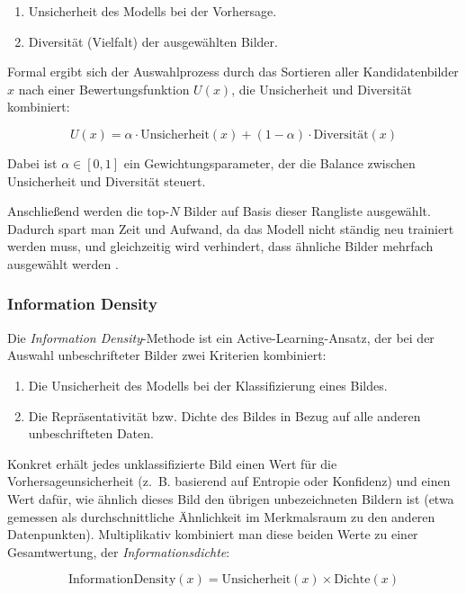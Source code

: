 \documentclass{article}
\begin{document}
	\begin{enumerate}
		\item Unsicherheit des Modells bei der Vorhersage.
		\item Diversität (Vielfalt) der ausgewählten Bilder.
	\end{enumerate}
	
	Formal ergibt sich der Auswahlprozess durch das Sortieren aller Kandidatenbilder $x$ nach einer Bewertungsfunktion $U(x)$, die Unsicherheit und Diversität kombiniert:
	
	\begin{equation}
		U(x) = \alpha \cdot \text{Unsicherheit}(x) + (1 - \alpha) \cdot \text{Diversität}(x)
	\end{equation}
	
	Dabei ist $\alpha \in [0,1]$ ein Gewichtungsparameter, der die Balance zwischen Unsicherheit und Diversität steuert.
	
	Anschließend werden die top-$N$ Bilder auf Basis dieser Rangliste ausgewählt. Dadurch spart man Zeit und Aufwand, da das Modell nicht ständig neu trainiert werden muss, und gleichzeitig wird verhindert, dass ähnliche Bilder mehrfach ausgewählt werden \cite{Cardoso2017}.
	
	
	\subsubsection{Information Density}
	Die \textit{Information Density}-Methode ist ein Active-Learning-Ansatz, der bei der Auswahl unbeschrifteter Bilder zwei Kriterien kombiniert:
	
	\begin{enumerate}
		\item Die Unsicherheit des Modells bei der Klassifizierung eines Bildes.
		\item Die Repräsentativität bzw. Dichte des Bildes in Bezug auf alle anderen unbeschrifteten Daten.
	\end{enumerate}
	
	Konkret erhält jedes unklassifizierte Bild einen Wert für die Vorhersageunsicherheit (z.~B. basierend auf Entropie oder Konfidenz) und einen Wert dafür, wie ähnlich dieses Bild den übrigen unbezeichneten Bildern ist (etwa gemessen als durchschnittliche Ähnlichkeit im Merkmalsraum zu den anderen Datenpunkten). Multiplikativ kombiniert man diese beiden Werte zu einer Gesamtwertung, der \textit{Informationsdichte}:
	
	\begin{equation}
		\text{InformationDensity}(x) = \text{Unsicherheit}(x) \times \text{Dichte}(x)
	\end{equation}
	
\end{document}
